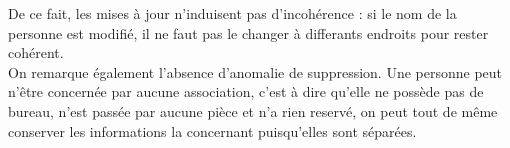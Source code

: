 	De ce fait, les mises à jour n'induisent pas d'incohérence : si le nom de la personne est modifié, il ne faut pas le changer à differants endroits pour rester cohérent.\\
	
	On remarque également l'absence d'anomalie de suppression. Une personne peut n'être concernée par aucune association, c'est à dire qu'elle ne possède pas de bureau, n'est passée par aucune pièce et n'a rien reservé, on peut tout de même conserver les informations la concernant puisqu'elles sont séparées.
